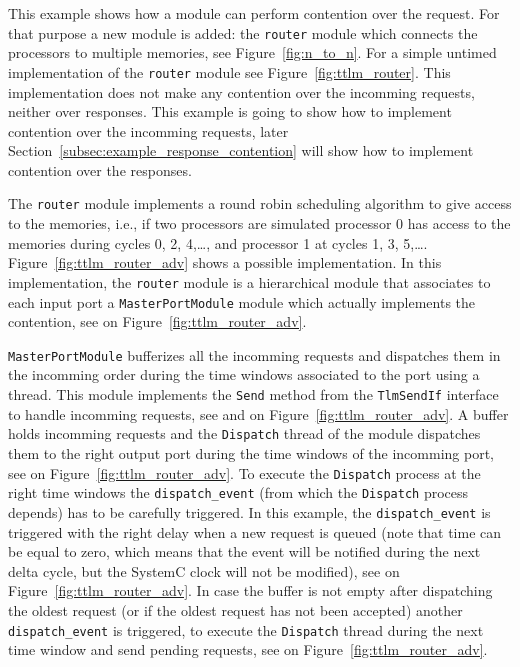 This example shows how a module can perform contention over the
request. For that purpose a new module is added: the \texttt{router}
module which connects the processors to multiple memories, see
Figure~\ref{fig:n_to_n}. For a simple untimed implementation of the
\texttt{router} module see Figure~\ref{fig:ttlm_router}. This
implementation does not make any contention over the incomming
requests, neither over responses. This example is going to show how to
implement contention over the incomming requests, later
Section~\ref{subsec:example_response_contention} will show how to
implement contention over the responses.

The \texttt{router} module implements a round robin scheduling
algorithm to give access to the memories, i.e., if two processors are
simulated processor 0 has access to the memories during cycles 0, 2,
4,\ldots , and processor 1 at cycles 1, 3, 5,\ldots.
Figure~\ref{fig:ttlm_router_adv} shows a possible implementation. In
this implementation, the \texttt{router} module is a hierarchical
module that associates to each input port a \texttt{MasterPortModule}
module which actually implements the contention, see {\large
  } on Figure~\ref{fig:ttlm_router_adv}.

\texttt{MasterPortModule} bufferizes all the incomming requests and
dispatches them in the incomming order during the time windows
associated to the port using a thread. This module implements the
\texttt{Send} method from the \texttt{TlmSendIf} interface to handle
incomming requests, see {\large {}} and {\large {}} on
Figure~\ref{fig:ttlm_router_adv}. A buffer holds incomming requests
and the \texttt{Dispatch} thread of the module dispatches them to the
right output port during the time windows of the incomming port, see
{\large {}} on Figure~\ref{fig:ttlm_router_adv}.  To execute
the \texttt{Dispatch} process at the right time windows the
\texttt{dispatch\_event} (from which the \texttt{Dispatch} process
depends) has to be carefully triggered. In this example, the
\texttt{dispatch\_event} is triggered with the right delay when a new
request is queued (note that time can be equal to zero, which means
that the event will be notified during the next delta cycle, but the
SystemC clock will not be modified), see {\large {}} on
Figure~\ref{fig:ttlm_router_adv}. In case the buffer is not empty
after dispatching the oldest request (or if the oldest request has not
been accepted) another \texttt{dispatch\_event} is triggered, to
execute the \texttt{Dispatch} thread during the next time window and
send pending requests, see {\large {}} on
Figure~\ref{fig:ttlm_router_adv}.


